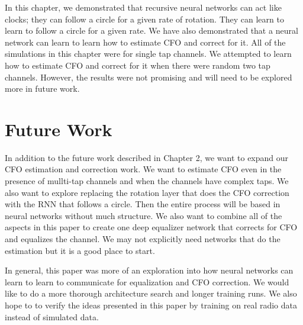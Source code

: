 In this chapter, we demonstrated that recursive neural networks can act like clocks; they can follow a circle for a given rate of rotation.  They can learn to learn to follow a circle for a given rate.
We have also demonstrated that a neural network can learn to learn how to estimate CFO and correct for it.  All of the simulations in this chapter were for single tap channels.  We attempted to learn how to estimate CFO and correct for it when there were random two tap channels.  However, the results were not promising and will need to be explored more in future work.


\section{Future Work}

In addition to the future work described in Chapter 2, we want to expand our CFO estimation and correction work.
We want to estimate CFO even in the presence of mullti-tap channels and when the channels have complex taps.
We also want to explore replacing the rotation layer that does the CFO correction with the RNN that follows a circle.  Then the entire process will be based in neural networks without much structure.
We also want to combine all of the aspects in this paper to create one deep equalizer network that corrects for CFO and equalizes the channel.  We may not explicitly need networks that do the estimation but it is a good place to start.

In general, this paper was more of an exploration into how neural networks can learn to learn to communicate for equalization and CFO correction.  We would like to do a more thorough architecture search and longer training runs.  We also hope to to verify the ideas presented in this paper by training on real radio data instead of simulated data.